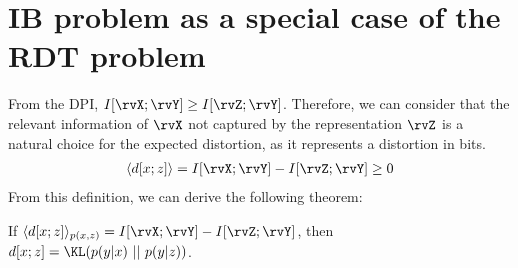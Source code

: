 \section{IB problem as a special case of the RDT problem}
From the \acf{DPI}, \(I[\rvX;\rvY] \geq I[\rvZ;\rvY]\). Therefore, we can consider that the relevant information of $\rvX$ not captured by the representation $\rvZ$ is a natural choice for the expected distortion, as it represents a distortion in bits.
\begin{align}
	\langle d[x;z] \rangle = I[\rvX;\rvY]-I[\rvZ;\rvY]\geq 0
\end{align}
From this definition, we can derive the following theorem:
\begin{theorem}
If $\langle d[x;z] \rangle_{p(x,z)}=I[\rvX;\rvY]-I[\rvZ;\rvY]$, then $\\d[x;z] = \KL(p(y|x)~||~p(y|z))$.
\end{theorem}
